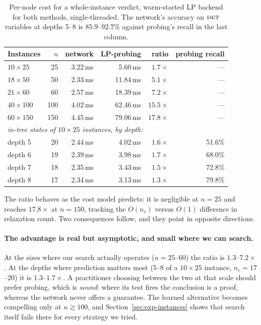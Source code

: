 \documentclass[11pt]{article}
\newcommand{\FORCED}{\textsc{det}}
\begin{document}
\begin{table}[h]
\centering
\begin{tabular}{lrrrrr}
\toprule
Instances & $n$ & network & LP-probing & ratio & probing recall \\
\midrule
$10\times25$ & 25 & 3.22\,ms & 5.60\,ms & $1.7\times$ & --- \\
$18\times50$ & 50 & 2.33\,ms & 11.84\,ms & $5.1\times$ & --- \\
$21\times60$ & 60 & 2.57\,ms & 18.39\,ms & $7.2\times$ & --- \\
$40\times100$ & 100 & 4.02\,ms & 62.46\,ms & $15.5\times$ & --- \\
$60\times150$ & 150 & 4.45\,ms & 79.06\,ms & $\mathbf{17.8\times}$ & --- \\
\midrule
\multicolumn{6}{l}{\emph{in-tree states of $10\times25$ instances, by depth:}} \\
depth 5 & 20 & 2.44\,ms & 4.02\,ms & $1.6\times$ & 51.6\% \\
depth 6 & 19 & 2.39\,ms & 3.98\,ms & $1.7\times$ & 68.0\% \\
depth 7 & 18 & 2.35\,ms & 3.43\,ms & $1.5\times$ & 72.8\% \\
depth 8 & 17 & 2.34\,ms & 3.13\,ms & $1.3\times$ & 79.8\% \\
\bottomrule
\end{tabular}
\caption{Per-node cost for a whole-instance verdict, warm-started LP backend for both methods, single-threaded. The network's accuracy on $\FORCED$ variables at depths 5--8 is $85.9$--$92.7\%$ against probing's recall in the last column.}
\label{tab:cost}
\end{table}

The ratio behaves as the cost model predicts: it is negligible at $n=25$ and reaches $17.8\times$ at $n=150$, tracking the $O(n_c)$ versus $O(1)$ difference in relaxation count. Two consequences follow, and they point in opposite directions.

\paragraph{The advantage is real but asymptotic, and small where we can search.} At the sizes where our search actually operates ($n=25$--$60$) the ratio is $1.3$--$7.2\times$. At the depths where prediction matters most (5--8 of a $10\times25$ instance, $n_c=17$--$20$) it is $1.3$--$1.7\times$. A practitioner choosing between the two at that scale should prefer probing, which is \emph{sound}: where its test fires the conclusion is a proof, whereas the network never offers a guarantee. The learned alternative becomes compelling only at $n\gtrsim 100$, and Section~\ref{sec:exp-instances} shows that search itself fails there for every strategy we tried.
\end{document}
